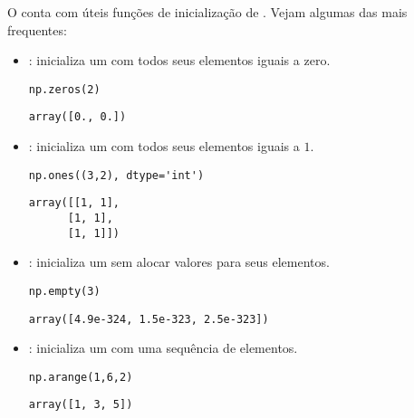 O {\numpy} conta com úteis funções de inicialização de {\PYTHONnumpyDOTarray}. Vejam algumas das mais frequentes:
\begin{itemize}
\item \hl{\PYTHONnumpyDOTzeros}: inicializa um {\PYTHONnumpyDOTarray} com todos seus elementos iguais a zero.
  
\begin{lstlisting}[framexrightmargin=-2.4em]
np.zeros(2)
\end{lstlisting}

\begin{verbatim}
array([0., 0.])
\end{verbatim}

  \item \hl{\PYTHONnumpyDOTones}: inicializa um {\PYTHONnumpyDOTarray} com todos seus elementos iguais a $1$.

\begin{lstlisting}[framexrightmargin=-2.4em]
np.ones((3,2), dtype='int')
\end{lstlisting}

\begin{verbatim}
array([[1, 1],
      [1, 1],
      [1, 1]])
\end{verbatim}

  \item \hl{\PYTHONnumpyDOTempty}: inicializa um {\PYTHONnumpyDOTarray} sem alocar valores para seus elementos.
  
\begin{lstlisting}[framexrightmargin=-2.4em]
np.empty(3)
\end{lstlisting}

\begin{verbatim}
array([4.9e-324, 1.5e-323, 2.5e-323])
\end{verbatim}

  \item \hl{\PYTHONnumpyDOTarange}: inicializa um {\PYTHONnumpyDOTarray} com uma sequência de elementos.

\begin{lstlisting}[framexrightmargin=-2.4em]
np.arange(1,6,2)
\end{lstlisting}

\begin{verbatim}
array([1, 3, 5])
\end{verbatim}


\end{itemize}
